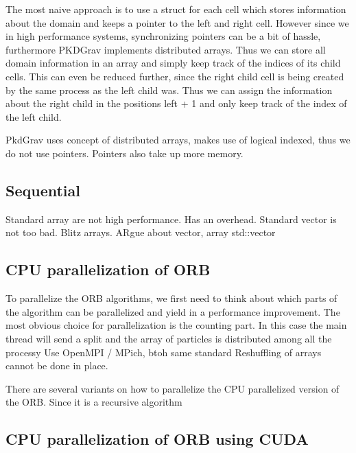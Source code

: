 \documentclass[]{article}
\begin{document}
The most naive approach is to use a struct for each cell which stores information about the domain and keeps a pointer to the left and right cell. However since we in high performance systems, synchronizing pointers can be a bit of hassle, furthermore PKDGrav implements distributed arrays. Thus we can store all domain information in an array and simply keep track of the indices of its child cells. This can even be reduced further, since the right child cell is being created by the same process as the left child was. Thus we can assign the information about the right child in the positions left + 1 and only keep track of the index of the left child.



PkdGrav uses concept of distributed arrays, makes use of logical indexed, thus we do not use pointers. Pointers also take up more memory. 


\subsection{Sequential}

Standard array are not high performance. Has an overhead. Standard vector is not too bad. Blitz arrays. 
ARgue about vector, array std::vector

\subsection{CPU parallelization of ORB}

To parallelize the ORB algorithms, we first need to think about which parts of the algorithm can be parallelized and yield in a performance improvement. The most obvious choice for parallelization is the counting part. In this case the main thread will send a split and the array of particles is distributed among all the processy
Use OpenMPI / MPich, btoh same standard
Reshuffling of arrays cannot be done in place.

There are several variants on how to parallelize the CPU parallelized version of the ORB. Since it is a recursive algorithm 


\subsection{CPU parallelization of ORB using CUDA }


\end{document}
